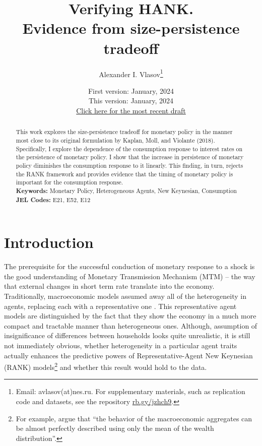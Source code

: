 \documentclass[12pt]{article}
\title{Verifying HANK.\\ Evidence from size-persistence tradeoff}
\author{Alexander I. Vlasov\thanks{Email: avlasov(at)nes.ru. For supplementary materials, such as replication code and datasets, see the repository \href{https://rb.gy/jzhch9}{rb.gy/jzhch9}.}}
\date{\normalsize First version: January, 2024\\\vspace{1ex} This version: January, 2024\\ \vspace{1ex}
\href{https://github.com/alvlsv/CheckingHank/blob/6906f23fcb1a16aa4fc9997532f52c1659e9c29f/Checking_HANK/Paper/CheckingHANK.pdf}{Click here for the most recent draft}}
\numberwithin{equation}{section}
\begin{document}
\maketitle



\begin{abstract}
    \noindent This work explores the size-persistence tradeoff for monetary policy in the manner most close to its original formulation by Kaplan, Moll, and Violante (2018). Specifically, I explore the dependence of the consumption response to interest rates on the persistence of monetary policy. I show that the increase in persistence of monetary policy diminishes the consumption response to it linearly. This finding, in turn, rejects the RANK framework and provides evidence that the timing of monetary policy is important for the consumption response.
    \\
    \noindent\textbf{Keywords:} Monetary Policy, Heterogeneous Agents, New Keynesian, Consumption
    \\
    \noindent\textbf{JEL Codes:} E21, E52, E12 \\
    \bigskip
\end{abstract}

\section{Introduction}

The prerequisite for the successful conduction of monetary response to a shock is the good understanding of Monetary Transmission Mechanism (MTM) -- the way that external changes in short term rate translate into the economy. 
Traditionally, macroeconomic models assumed away all of the heterogeneity in agents, replacing each with a representative one \cite{Gali2018}.
This representative agent models are distinguished by the fact that they show the economy in a much more compact and tractable manner than heterogeneous ones.
Although, assumption of insignificance of differences between households looks quite unrealistic, it is still not immediately obvious, whether heterogeneity in a particular agent traits actually enhances the predictive powers of Representative-Agent New Keynesian (RANK) models\footnote{For example, \citet{Krusell1998} argue that  ``the behavior of the macroeconomic aggregates can be almost perfectly described using only the mean of the wealth distribution''.} 
and whether this result would hold to the data.
\end{document}
